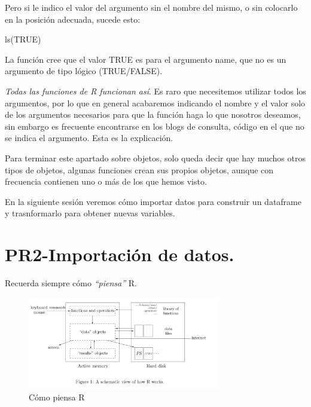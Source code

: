 \documentclass[
  letterpaper,
  DIV=11,
  numbers=noendperiod]{scrreprt}
\newenvironment{Shaded}{\begin{snugshade}}{\end{snugshade}}
\newcommand{\ConstantTok}[1]{\textcolor[rgb]{0.56,0.35,0.01}{#1}}
\newcommand{\FunctionTok}[1]{\textcolor[rgb]{0.28,0.35,0.67}{#1}}
\newcommand{\NormalTok}[1]{\textcolor[rgb]{0.00,0.23,0.31}{#1}}
\begin{document}
Pero si le indico el valor del argumento sin el nombre del mismo, o sin
colocarlo en la posición adecuada, sucede esto:

\begin{Shaded}
\begin{Highlighting}[]
\FunctionTok{ls}\NormalTok{(}\ConstantTok{TRUE}\NormalTok{)}
\end{Highlighting}
\end{Shaded}

La función cree que el valor TRUE es para el argumento name, que no es
un argumento de tipo lógico (TRUE/FALSE).

\emph{Todas las funciones de R funcionan así}. Es raro que necesitemos
utilizar todos los argumentos, por lo que en general acabaremos
indicando el nombre y el valor solo de los argumentos necesarios para
que la función haga lo que nosotros deseamos, sin embargo es frecuente
encontrarse en los blogs de consulta, código en el que no se indica el
argumento. Esta es la explicación.

Para terminar este apartado sobre objetos, solo queda decir que hay
muchos otros tipos de objetos, algunas funciones crean sus propios
objetos, aunque con frecuencia contienen uno o más de los que hemos
visto.

En la siguiente sesión veremos cómo importar datos para construir un
dataframe y trasnformarlo para obtener nuevas variables.


\hypertarget{pr2-importaciuxf3n-de-datos.}{%
\chapter{PR2-Importación de datos.}\label{pr2-importaciuxf3n-de-datos.}}

Recuerda siempre cómo \emph{``piensa''} R.

\begin{figure}

{\centering \includegraphics[width=0.75\textwidth,height=\textheight]{./pics/como_piensa_R.png}

}

\caption{Cómo piensa R}

\end{figure}
\end{document}
